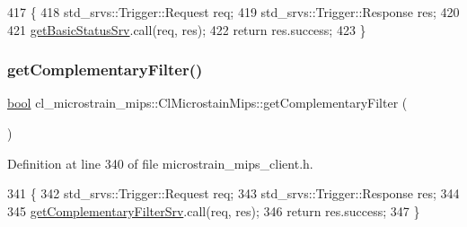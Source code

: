 \begin{DoxyCode}
417     \{
418         std\_srvs::Trigger::Request req;
419         std\_srvs::Trigger::Response res;
420 
421         \hyperlink{classcl__microstrain__mips_1_1ClMicrostainMips_ab2d9efccc6237800a890135a4249eaf8}{getBasicStatusSrv}.call(req, res);
422         \textcolor{keywordflow}{return} res.success;
423     \}
\end{DoxyCode}
\mbox{\label{classcl__microstrain__mips_1_1ClMicrostainMips_aaff58eafdd41438a7af7c6adee3b2d5b}} 
\subsubsection{\texorpdfstring{get\+Complementary\+Filter()}{getComplementaryFilter()}}
{\footnotesize\ttfamily \hyperlink{classbool}{bool} cl\+\_\+microstrain\+\_\+mips\+::\+Cl\+Microstain\+Mips\+::get\+Complementary\+Filter (\begin{DoxyParamCaption}{ }\end{DoxyParamCaption})\hspace{0.3cm}{\ttfamily [inline]}}



Definition at line 340 of file microstrain\+\_\+mips\+\_\+client.\+h.


\begin{DoxyCode}
341     \{
342         std\_srvs::Trigger::Request req;
343         std\_srvs::Trigger::Response res;
344 
345         \hyperlink{classcl__microstrain__mips_1_1ClMicrostainMips_a39aa3d9d1bbe86d90548f7422aa0b4a4}{getComplementaryFilterSrv}.call(req, res);
346         \textcolor{keywordflow}{return} res.success;
347     \}
\end{DoxyCode}
\mbox{\label{classcl__microstrain__mips_1_1ClMicrostainMips_a6826c989f0b2a29b87c6e78140dfe6d1}} 
